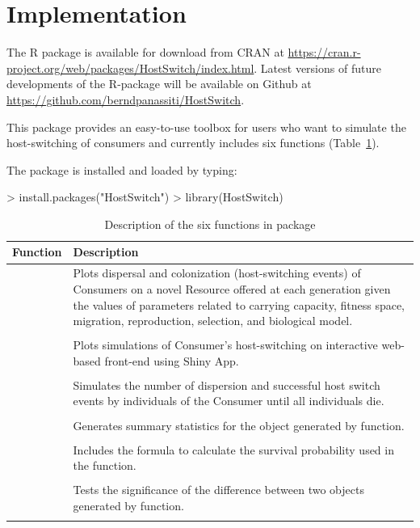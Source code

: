 \section{Implementation}
The  R package is available for download from CRAN at \sloppy
\noindent\href{https://cran.r-project.org/web/packages/HostSwitch/index.html}{https://cran.r-project.org/web/packages/HostSwitch/index.html}.
\noindent Latest versions of future developments of the R-package will be available on Github at \sloppy
\noindent\href{https://github.com/berndpanassiti/HostSwitch}{https://github.com/berndpanassiti/HostSwitch}. 

\noindent This package provides an easy-to-use toolbox for users who want to simulate the host-switching of consumers and currently includes six functions (Table~\ref{tab:functions}).

The package is installed and loaded by typing:
\begin{example}
> install.packages("HostSwitch")
> library(HostSwitch)
\end{example}

\begin{table}[htbp]
\caption{Description of the six functions in  package}
\label{tab:functions}
  \begin{tabular}{ll}
    \toprule
    \textbf{Function} & \textbf{Description}\\
  \midrule
   \raisebox{\normalbaselineskip}{ \code{plotHostSwitch}} &
   \parbox{0.7\linewidth}{Plots dispersal and colonization (host-switching events) of Consumers on a novel Resource offered at each generation given the values of parameters related to carrying capacity, fitness space, migration, reproduction, selection, and biological model.}\\
    \\
    & \parbox{0.7\linewidth}{Plots simulations of Consumer's host-switching on interactive web-based front-end using Shiny App.}\\
    \\
    & \parbox{0.7\linewidth}{Simulates the number of dispersion and successful host switch events by individuals of the Consumer until all individuals die.}\\ 
    \\
    & \parbox{0.7\linewidth}{Generates summary statistics for the object generated by  function.}\\ 
    \\
    & \parbox{0.7\linewidth}{Includes the formula to calculate the survival probability used in the  function.}\\
    \\ 
    & \parbox{0.7\linewidth}{Tests the significance of the difference between two objects generated by  function.}\\
  \\
  \bottomrule
 \end{tabular}
 \end{table} 

